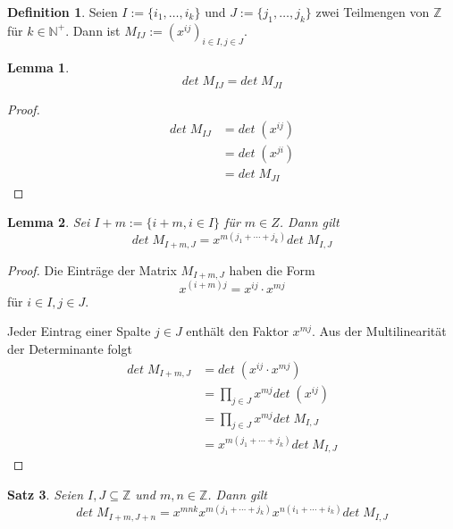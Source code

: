 \documentclass{article}
\newtheorem{satz}{Satz}
\newtheorem{lemma}[satz]{Lemma}
\theoremstyle{definition}
\newtheorem{definition}{Definition}
\renewcommand{\det}{det\;}
\begin{document}
\begin{definition}
    Seien $I := \{i_1,\dots, i_k\}$ und $J := \{j_1,\dots, j_k\}$ zwei Teilmengen von $\mathbb{Z}$ für $k \in \mathbb{N}^+$. Dann ist $M_{IJ} := (x^{ij})_{i \in I, j \in J}$. 
\end{definition}

\begin{lemma} \label{lemma:transpose}
    \begin{equation*}
        \det M_{IJ} = \det M_{JI}
    \end{equation*}
\end{lemma}

\begin{proof}
    \begin{align*}
        \det M_{IJ} &= \det (x^{ij}) \\
                    &= \det (x^{ji}) \\
                    &= \det M_{JI}
    \end{align*}
\end{proof}

\begin{lemma} \label{lemma:translation}
    Sei $I + m := \{ i + m, i \in I\}$ für $m \in Z$. Dann gilt
    \begin{equation*}
        \det{} M_{I+m,J} = x^{m(j_1+\cdots +j_k)} \det M_{I,J}
    \end{equation*}
\end{lemma}

\begin{proof}
    Die Einträge der Matrix $M_{I+m,J}$ haben die Form 
    \begin{equation*}
        x^{(i+m)j} = x^{ij} \cdot x^{mj}
    \end{equation*} für $i\in I, j\in J$.

    Jeder Eintrag einer Spalte $j \in J$ enthält den Faktor $x^{mj}$. Aus der Multilinearität der Determinante folgt
    \begin{align*}
        \det M_{I+m,J}  &= \det (x^{ij} \cdot x^{mj}) \\ 
                        &= \prod_{j \in J} x^{mj} \det (x^{ij}) \\ 
                        &= \prod_{j \in J} x^{mj}  \det M_{I,J} \\
                        &= x^{m(j_1+\cdots +j_k)} \det M_{I,J}
    \end{align*}
\end{proof}

\begin{satz}
    Seien $I,J \subseteq \mathbb{Z}$ und $m,n \in \mathbb{Z}$. Dann gilt
    \begin{equation*}
        \det{} M_{I+m,J+n} = x^{mnk} x^{m(j_1 +\cdots + j_k)} x^{n(i_1+\cdots +i_k)} \det{} M_{I,J}
    \end{equation*}
\end{satz}
\end{document}
